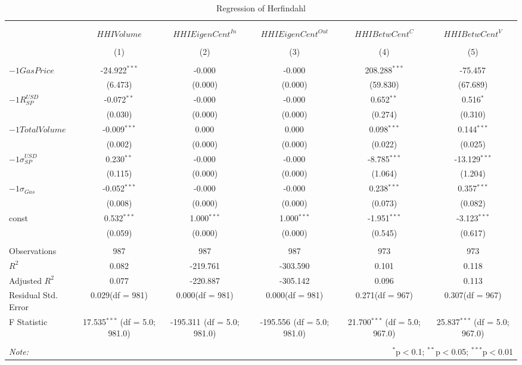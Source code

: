 \begin{table}[!htbp] \centering
  \caption{Regression of Herfindahl}
\begin{tabular}{@{\extracolsep{5pt}}lccccc}
\\[-1.8ex]\hline
\hline \\[-1.8ex]
\\[-1.8ex] & \multicolumn{1}{c}{${	 HHIVolume}$} & \multicolumn{1}{c}{${	 HHIEigenCent}^{In}$} & \multicolumn{1}{c}{${	 HHIEigenCent}^{Out}$} & \multicolumn{1}{c}{${	 HHIBetwCent}^C$} & \multicolumn{1}{c}{${	 HHIBetwCent}^V$}  \\
\\[-1.8ex] & (1) & (2) & (3) & (4) & (5) \\
\hline \\[-1.8ex]
 ${	-1 GasPrice}$ & -24.922$^{***}$ & -0.000$^{}$ & -0.000$^{}$ & 208.288$^{***}$ & -75.457$^{}$ \\
  & (6.473) & (0.000) & (0.000) & (59.830) & (67.689) \\
 ${	-1 R}^{USD}_{SP}$ & -0.072$^{**}$ & -0.000$^{}$ & -0.000$^{}$ & 0.652$^{**}$ & 0.516$^{*}$ \\
  & (0.030) & (0.000) & (0.000) & (0.274) & (0.310) \\
 ${	-1 TotalVolume}$ & -0.009$^{***}$ & 0.000$^{}$ & 0.000$^{}$ & 0.098$^{***}$ & 0.144$^{***}$ \\
  & (0.002) & (0.000) & (0.000) & (0.022) & (0.025) \\
 ${	-1 \sigma}^{USD}_{SP}$ & 0.230$^{**}$ & -0.000$^{}$ & -0.000$^{}$ & -8.785$^{***}$ & -13.129$^{***}$ \\
  & (0.115) & (0.000) & (0.000) & (1.064) & (1.204) \\
 ${	-1 \sigma}_{Gas}$ & -0.052$^{***}$ & -0.000$^{}$ & -0.000$^{}$ & 0.238$^{***}$ & 0.357$^{***}$ \\
  & (0.008) & (0.000) & (0.000) & (0.073) & (0.082) \\
 const & 0.532$^{***}$ & 1.000$^{***}$ & 1.000$^{***}$ & -1.951$^{***}$ & -3.123$^{***}$ \\
  & (0.059) & (0.000) & (0.000) & (0.545) & (0.617) \\
\hline \\[-1.8ex]
 Observations & 987 & 987 & 987 & 973 & 973 \\
 $R^2$ & 0.082 & -219.761 & -303.590 & 0.101 & 0.118 \\
 Adjusted $R^2$ & 0.077 & -220.887 & -305.142 & 0.096 & 0.113 \\
 Residual Std. Error & 0.029(df = 981) & 0.000(df = 981) & 0.000(df = 981) & 0.271(df = 967) & 0.307(df = 967)  \\
 F Statistic & 17.535$^{***}$ (df = 5.0; 981.0) & -195.311$^{}$ (df = 5.0; 981.0) & -195.556$^{}$ (df = 5.0; 981.0) & 21.700$^{***}$ (df = 5.0; 967.0) & 25.837$^{***}$ (df = 5.0; 967.0) \\
\hline
\hline \\[-1.8ex]
\textit{Note:} & \multicolumn{5}{r}{$^{*}$p$<$0.1; $^{**}$p$<$0.05; $^{***}$p$<$0.01} \\
\end{tabular}
\end{table}